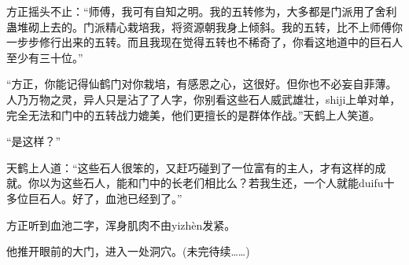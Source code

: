 \begin{this_body}
方正摇头不止：“师傅，我可有自知之明。我的五转修为，大多都是门派用了舍利蛊堆砌上去的。门派精心栽培我，将资源朝我身上倾斜。我的五转，比不上师傅你一步步修行出来的五转。而且我现在觉得五转也不稀奇了，你看这地道中的巨石人至少有三十位。”

“方正，你能记得仙鹤门对你栽培，有感恩之心，这很好。但你也不必妄自菲薄。人乃万物之灵，异人只是沾了了人字，你别看这些石人威武雄壮，shiji上单对单，完全无法和门中的五转战力媲美，他们更擅长的是群体作战。”天鹤上人笑道。

“是这样？”

天鹤上人道：“这些石人很笨的，又赶巧碰到了一位富有的主人，才有这样的成就。你以为这些石人，能和门中的长老们相比么？若我生还，一个人就能duifu十多位巨石人。好了，血池已经到了。”

方正听到血池二字，浑身肌肉不由yizhèn发紧。

他推开眼前的大门，进入一处洞穴。(未完待续……)

\end{this_body}

